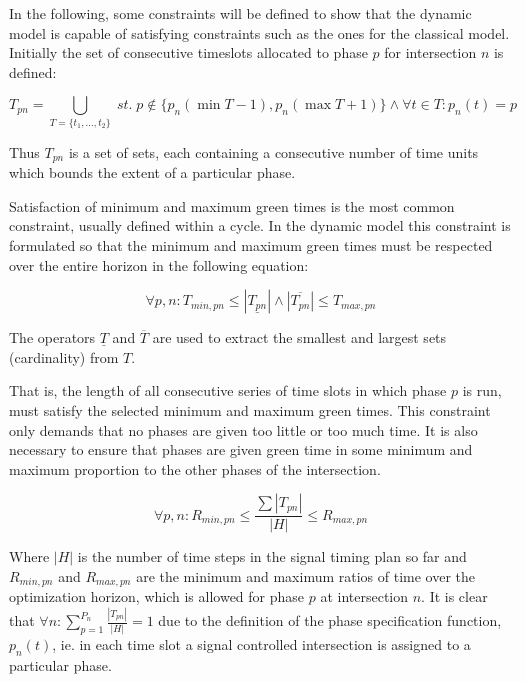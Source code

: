 In the following, some constraints will be defined to show that the
dynamic model is capable of satisfying constraints such as the ones
for the classical model. Initially the set of consecutive timeslots
allocated to phase $p$ for intersection $n$ is defined:

\begin{equation}
T_{pn} = \bigcup_{T = \lbrace t_1,...,t_2 \rbrace} \; st. \; p \not \in \lbrace p_n(\min T - 1), p_n(\max T + 1) \rbrace \wedge\forall t \in T: p_n(t) = p 
\end{equation}

Thus $T_{pn}$ is a set of sets, each containing a consecutive
number of time units which bounds the extent of a particular phase.

Satisfaction of minimum and maximum green times is the most common
constraint, usually defined within a cycle. In the dynamic model this
constraint is formulated so that the minimum and maximum green times
must be respected over the entire horizon in the following equation:

\begin{equation}
\label{eqn:minmaxtimes}
\forall p,n : T_{min,pn} \leq |\underline{T_{pn}}| \wedge |\overline{T_{pn}}| \leq T_{max,pn} 
\end{equation}

The operators $\underline{T}$ and $\overline{T}$ are used to extract the smallest and largest sets (cardinality) from $T$.

That is, the length of all consecutive series of time slots in which
phase $p$ is run, must satisfy the selected minimum and maximum green
times. This constraint only demands that no phases are given too
little or too much time. It is also necessary to ensure that phases
are given green time in some minimum and maximum proportion to the
other phases of the intersection.

\begin{equation}
\label{eqn:proportions}
\forall p,n : R_{min,pn} \leq \frac{\sum |T_{pn}|}{|H|} \leq R_{max,pn}
\end{equation}

Where $|H|$ is the number of time steps in the signal timing plan so
far and $R_{min,pn}$ and $R_{max,pn}$ are the minimum and maximum
ratios of time over the optimization horizon, which is allowed for
phase $p$ at intersection $n$. It is clear that $\forall n :
\displaystyle\sum_{p=1}^{P_n}\frac{|T_{pn}|}{|H|} = 1$ due to the
definition of the phase specification function, $p_n(t)$, ie. in each
time slot a signal controlled intersection is assigned to a particular
phase.


